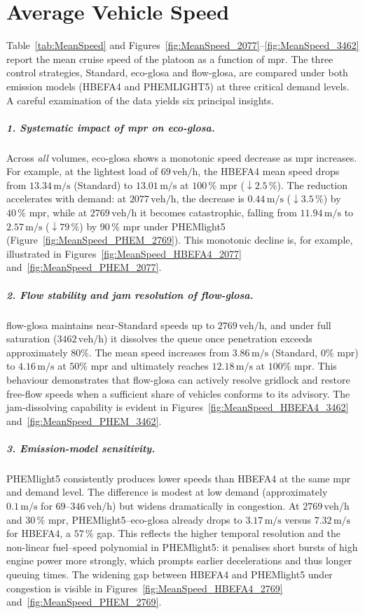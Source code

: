 \section{Average Vehicle Speed}
\label{sec:Results_MeanSpeed}

Table~\ref{tab:MeanSpeed} and Figures~\ref{fig:MeanSpeed_2077}–\ref{fig:MeanSpeed_3462} report the mean cruise speed of the platoon as a function of \ac{mpr}. The three control strategies, Standard, \ac{eco-glosa} and \ac{flow-glosa}, are compared under both emission models (HBEFA4 and PHEMLIGHT5) at three critical demand levels. A careful examination of the data yields six principal insights.

\subparagraph*{1. Systematic impact of \ac{mpr} on \ac{eco-glosa}.}
Across \emph{all} volumes, \ac{eco-glosa} shows a monotonic speed decrease as \ac{mpr} increases. For example, at the lightest load of $69\,\mathrm{veh/h}$, the HBEFA4 mean speed drops from $13.34\,\mathrm{m/s}$ (Standard) to $13.01\,\mathrm{m/s}$ at $100\,\%$ \ac{mpr} ($\downarrow 2.5\,\%$). The reduction accelerates with demand: at $2077\,\mathrm{veh/h}$, the decrease is $0.44\,\mathrm{m/s}$ ($\downarrow 3.5\,\%$) by $40\,\%$ \ac{mpr}, while at $2769\,\mathrm{veh/h}$ it becomes catastrophic, falling from $11.94\,\mathrm{m/s}$ to $2.57\,\mathrm{m/s}$ ($\downarrow 79\,\%$) by $90\,\%$ \ac{mpr} under PHEMlight5 (Figure~\ref{fig:MeanSpeed_PHEM_2769}). This monotonic decline is, for example, illustrated in Figures~\ref{fig:MeanSpeed_HBEFA4_2077} and~\ref{fig:MeanSpeed_PHEM_2077}.

\subparagraph*{2. Flow stability and jam resolution of \ac{flow-glosa}.}
\ac{flow-glosa} maintains near-Standard speeds up to $2769\,\mathrm{veh/h}$, and under full saturation ($3462\,\mathrm{veh/h}$) it dissolves the queue once penetration exceeds approximately $80\%$. The mean speed increases from $\mathbf{3.86\,\mathrm{m/s}}$ (Standard, 0\% \ac{mpr}) to $4.16\,\mathrm{m/s}$ at $50\%$ \ac{mpr} and ultimately reaches $\mathbf{12.18\,\mathrm{m/s}}$ at $100\%$ \ac{mpr}. This behaviour demonstrates that \ac{flow-glosa} can actively resolve gridlock and restore free-flow speeds when a sufficient share of vehicles conforms to its advisory. The jam-dissolving capability is evident in Figures~\ref{fig:MeanSpeed_HBEFA4_3462} and~\ref{fig:MeanSpeed_PHEM_3462}.  


\subparagraph*{3. Emission-model sensitivity.}
PHEMlight5 consistently produces lower speeds than HBEFA4 at the same \ac{mpr} and demand level. The difference is modest at low demand (approximately $0.1\,\mathrm{m/s}$ for $69$--$346\,\mathrm{veh/h}$) but widens dramatically in congestion. At $2769\,\mathrm{veh/h}$ and $30\,\%$ \ac{mpr}, PHEMlight5--\ac{eco-glosa} already drops to $3.17\,\mathrm{m/s}$ versus $7.32\,\mathrm{m/s}$ for HBEFA4, a $57\,\%$ gap. This reflects the higher temporal resolution and the non-linear fuel--speed polynomial in PHEMlight5: it penalises short bursts of high engine power more strongly, which prompts earlier decelerations and thus longer queuing times. The widening gap between HBEFA4 and PHEMlight5 under congestion is visible in Figures~\ref{fig:MeanSpeed_HBEFA4_2769} and~\ref{fig:MeanSpeed_PHEM_2769}.

